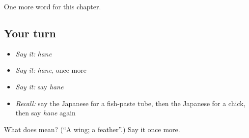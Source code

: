 \begin{grammarlens}[title={What you've built}]
One more word for this chapter.
\end{grammarlens}

\subsection*{Your turn}
\begin{itemize}
\raggedright
  \item \emph{Say it:} \emph{hane}
  \item \emph{Say it:} \emph{hane}, once more
  \item \emph{Say it:} say \emph{hane}
  \item \emph{Recall:} say the Japanese for a fish-paste tube, then the Japanese for a chick, then say \emph{hane} again
\end{itemize}

\begin{tcolorbox}[breakable,colback=teal!4,colframe=teal!35!black,title={Before you move on}]
What does  mean? (\textquotedblleft{}A wing; a feather\textquotedblright{}.) Say it once more.
\end{tcolorbox}
